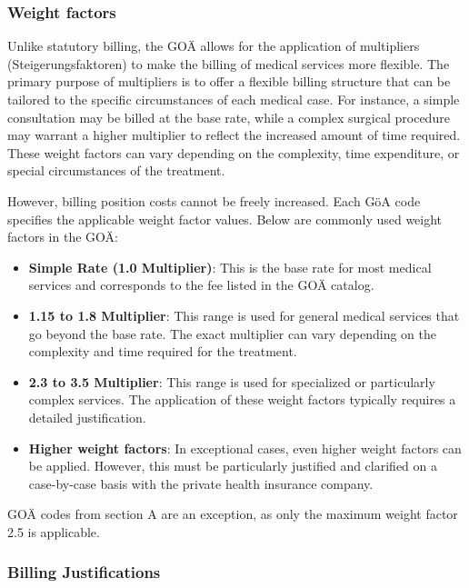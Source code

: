 \subsubsection{Weight factors}
Unlike statutory billing, the GOÄ allows for the application of multipliers (Steigerungsfaktoren) to make the billing of medical services more flexible.
The primary purpose of multipliers is to offer a flexible billing structure that can be tailored to the specific circumstances of each medical case.
For instance, a simple consultation may be billed at the base rate, while a complex surgical procedure may warrant a higher multiplier to reflect the increased amount of time required.
These weight factors can vary depending on the complexity, time expenditure, or special circumstances of the treatment.

However, billing position costs cannot be freely increased.
Each GöA code specifies the applicable weight factor values.
Below are commonly used weight factors in the GOÄ\cite[]{bruck1998kommentar}:

\begin{itemize}
    \item \textbf{Simple Rate (1.0 Multiplier)}: This is the base rate for most medical services and corresponds to the fee listed in the GOÄ catalog.
    \item \textbf{1.15 to 1.8 Multiplier}: This range is used for general medical services that go beyond the base rate.
    The exact multiplier can vary depending on the complexity and time required for the treatment.
    \item \textbf{2.3 to 3.5 Multiplier}: This range is used for specialized or particularly complex services.
    The application of these weight factors typically requires a detailed justification.
    \item \textbf{Higher weight factors}: In exceptional cases, even higher weight factors can be applied.
    However, this must be particularly justified and clarified on a case-by-case basis with the private health insurance company.
\end{itemize}

GOÄ codes from section A are an exception, as only the maximum weight factor 2.5 is applicable\cite[]{hermanns2011gebuhrenordnung}.

\subsubsection{Billing Justifications}

